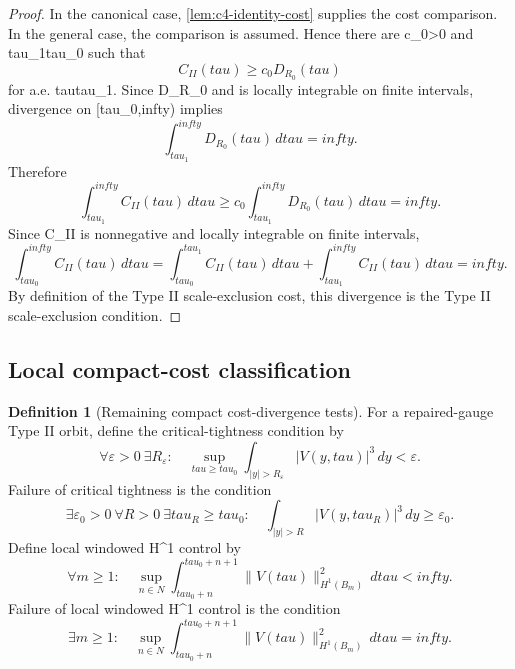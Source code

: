 \documentclass[11pt]{amsart}
\def\({}%
\def\){}%
\def\tilde#1{#1}%
\def\mathfrak#1{#1}%
\def\mathrm#1{#1}%
\def\mathbb#1{#1}%
\def\tau{tau}%
\def\infty{infty}%
\theoremstyle{plain}
\theoremstyle{definition}
\newtheorem{definition}[definition]{Definition}
\theoremstyle{remark}
\begin{document}
\begin{proof}
In the canonical case, \cref{lem:c4-identity-cost} supplies the cost comparison.
In the general case, the comparison is assumed.  Hence there are
\(c_0>0\) and \(\tau_1\ge\tau_0\) such that
\[
  \mathfrak C_{\mathrm{II}}(\tau)
  \ge c_0\tilde{\mathfrak D}_{R_0}(\tau)
\]
for a.e. \(\tau\ge\tau_1\).  Since
\(\tilde{\mathfrak D}_{R_0}\) and is locally integrable on finite
intervals, divergence on \([\tau_0,\infty)\) implies
\[
  \int_{\tau_1}^{\infty}
  \tilde{\mathfrak D}_{R_0}(\tau)\,d\tau=\infty.
\]
Therefore
\[
  \int_{\tau_1}^{\infty}
  \mathfrak C_{\mathrm{II}}(\tau)\,d\tau
  \ge
  c_0\int_{\tau_1}^{\infty}
  \tilde{\mathfrak D}_{R_0}(\tau)\,d\tau
  =\infty.
\]
Since \(\mathfrak C_{\mathrm{II}}\) is nonnegative and locally integrable on
finite intervals,
\[
  \int_{\tau_0}^{\infty}
  \mathfrak C_{\mathrm{II}}(\tau)\,d\tau
  =
  \int_{\tau_0}^{\tau_1}\mathfrak C_{\mathrm{II}}(\tau)\,d\tau
  +
  \int_{\tau_1}^{\infty}\mathfrak C_{\mathrm{II}}(\tau)\,d\tau
  =\infty.
\]
By definition of the Type II scale-exclusion cost, this divergence is the Type II
scale-exclusion condition.
\end{proof}

\subsection{Local compact-cost classification}

\begin{definition}[Remaining compact cost-divergence tests]
\label{def:c5-compact-tests}
For a repaired-gauge Type II orbit, define the critical-tightness
condition by
\[
  \forall\varepsilon>0\ \exists R_\varepsilon:\quad
  \sup_{\tau\ge\tau_0}
  \int_{|y|>R_\varepsilon}|V(y,\tau)|^3\,dy<\varepsilon.
\]
Failure of critical tightness is the condition
\[
  \exists\varepsilon_0>0\ \forall R>0\ \exists\tau_R\ge\tau_0:\quad
  \int_{|y|>R}|V(y,\tau_R)|^3\,dy\ge\varepsilon_0.
\]
Define local windowed \(H^1\) control by
\[
  \forall m\ge1:\quad
  \sup_{n\in\mathbb N}
  \int_{\tau_0+n}^{\tau_0+n+1}
  \|V(\tau)\|_{H^1(B_m)}^2\,d\tau<\infty.
\]
Failure of local windowed \(H^1\) control is the condition
\[
  \exists m\ge1:\quad
  \sup_{n\in\mathbb N}
  \int_{\tau_0+n}^{\tau_0+n+1}
  \|V(\tau)\|_{H^1(B_m)}^2\,d\tau=\infty.
\]
\end{definition}
\end{document}
